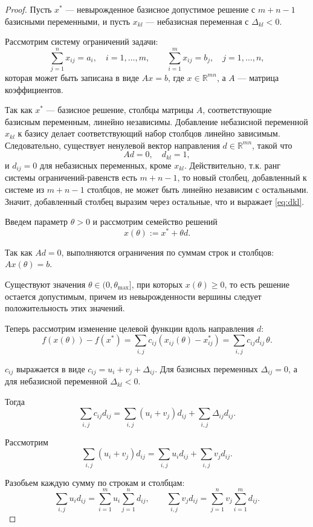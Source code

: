 \documentclass[12pt]{article}
\theoremstyle{definition}
\theoremstyle{plain}
\theoremstyle{definition}
\begin{document}
\begin{proof}
Пусть $x^*$ --- невырожденное базисное допустимое решение с $m+n-1$ базисными переменными, и пусть
$x_{kl}$ --- небазисная переменная с $\Delta_{kl} < 0$.  

Рассмотрим систему ограничений задачи:
\[
\sum_{j=1}^{n} x_{ij} = a_i, \quad i = 1,\dots,m, \qquad
\sum_{i=1}^{m} x_{ij} = b_j, \quad j = 1,\dots,n,
\]
которая может быть записана в виде $A x = b$, где $x \in
\mathbb{R}^{m n}$, а $A$ --- матрица коэффициентов.

Так как $x^*$ --- базисное решение, столбцы матрицы $A$,
соответствующие базисным переменным, линейно независимы.  
Добавление небазисной переменной $x_{kl}$ к базису делает соответствующий
набор столбцов линейно зависимым. Следовательно,
существует ненулевой вектор направления $d \in \mathbb{R}^{m n}$, такой что
\begin{equation}\label{eq:dkl}
A d = 0, \quad d_{kl} = 1,
\end{equation}
и $d_{ij} = 0$ для небазисных переменных, кроме $x_{kl}$. Действительно, т.к. ранг системы
ограничений-равенств есть $m + n - 1$, то новый столбец,
добавленный к системе из $m + n - 1$ столбцов, не может быть линейно
независим с остальными. Значит, добавленный столбец выразим через
остальные, что и выражает \eqref{eq:dkl}. 

Введем параметр $\theta > 0$ и рассмотрим семейство решений
\[
x(\theta) := x^* + \theta d.
\]

Так как $A d = 0$, выполняются ограничения по суммам строк и столбцов:
$A x(\theta) = b$.  

Существуют значения $\theta \in (0, \theta_{\max}]$, при которых
$x(\theta) \ge 0$, то есть решение остается допустимым, причем из невырожденности
вершины следует положительность этих значений.

Теперь рассмотрим изменение целевой функции вдоль направления $d$:
\[
f(x(\theta)) - f(x^*) = \sum_{i,j} c_{ij} (x_{ij}(\theta) - x^*_{ij})
= \sum_{i,j} c_{ij} d_{ij} \, \theta.
\]

$c_{ij}$ выражается в виде $c_{ij} = u_i + v_j + \Delta_{ij}$.
Для базисных переменных $\Delta_{ij} = 0$, а для небазисной переменной 
\(\Delta_{kl} < 0\).

Тогда
\[
\sum_{i,j} c_{ij} d_{ij} 
= \sum_{i,j} (u_i + v_j) d_{ij} + \sum_{i,j} \Delta_{ij} d_{ij}.
\]

Рассмотрим
\[
\sum_{i,j} (u_i + v_j) d_{ij} = \sum_{i,j} u_i d_{ij} + \sum_{i,j} v_j d_{ij}.
\]

Разобьем каждую сумму по строкам и столбцам:
\[
\sum_{i,j} u_i d_{ij} = \sum_{i=1}^m u_i \sum_{j=1}^n d_{ij}, \qquad
\sum_{i,j} v_j d_{ij} = \sum_{j=1}^n v_j \sum_{i=1}^m d_{ij}.
\]


\end{proof}
\end{document}
